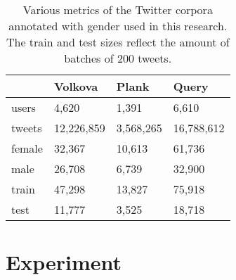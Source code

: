 \documentclass[11pt,letterpaper]{article}
\begin{document}
\begin{table}
	\centering
	\begin{tabular}{|l||p{1.65cm}|p{1.45cm}|p{1.65cm}|}
		\hline
		       & \textbf{Volkova} & \textbf{Plank} & \textbf{Query} \\
		\hline
		users  & 4,620            & 1,391           & 6,610          \\
		tweets & 12,226,859       & 3,568,265       & 16,788,612     \\
		\hline
		female & 32,367           & 10,613          & 61,736         \\
		male   & 26,708           & 6,739           & 32,900         \\
		\hline
		train  & 47,298           & 13,827          & 75,918         \\
		test   & 11,777           & 3,525           & 18,718         \\
		\hline
	\end{tabular}
	\caption{Various metrics of the Twitter corpora annotated with gender used in
		this research. The train and test sizes reflect the amount of batches
	of 200 tweets.}
	\label{tab:dat}
\end{table}

\section{Experiment}
\end{document}
